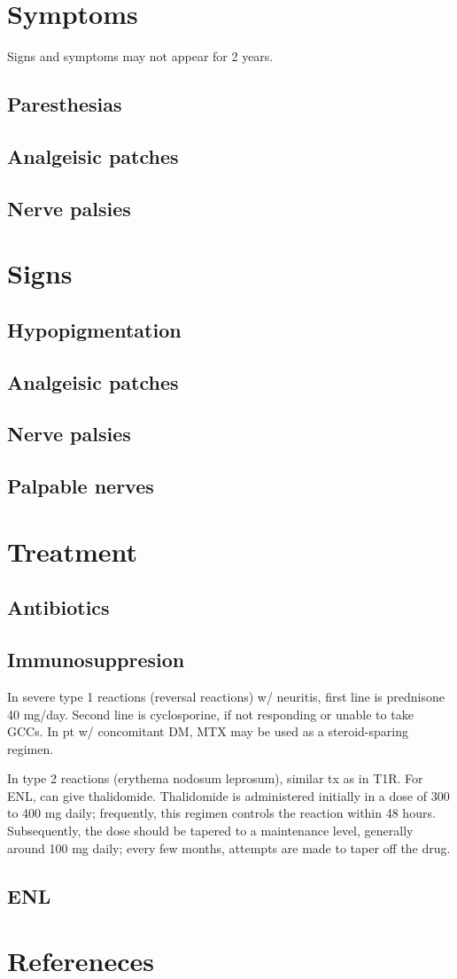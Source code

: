 \documentclass{article}
\begin{document}
\section{Symptoms}
 Signs and symptoms may not appear for 2 years.
\subsection{Paresthesias}
\subsection{ Analgeisic patches}
\subsection{Nerve palsies}
\section{Signs}
\subsection{Hypopigmentation}
\subsection{Analgeisic patches}
\subsection{Nerve palsies}
\subsection{Palpable nerves}
\section{Treatment}
\subsection{Antibiotics}
\subsection{Immunosuppresion}
In severe type 1 reactions (reversal reactions) w/ neuritis, first line is prednisone 40 mg/day. Second line is cyclosporine, if not responding or unable to take GCCs. In pt w/ concomitant DM, MTX may be used as a steroid-sparing regimen.

In type 2 reactions (erythema nodosum leprosum), similar tx as in T1R. For ENL, can give thalidomide. Thalidomide is administered initially in a dose of 300 to 400 mg daily; frequently, this regimen controls the reaction within 48 hours. Subsequently, the dose should be tapered to a maintenance level, generally around 100 mg daily; every few months, attempts are made to taper off the drug.
\subsection{ENL}
\section{Refereneces}
	
	
	\cite{khardenavis2014}
	\cite{chandranesan2018}
	\cite{rao2016}
	\cite{ding2019}
	\cite{baveja2019}
	\cite{prasoon2015}
	\cite{shelley2018}
\end{document}
